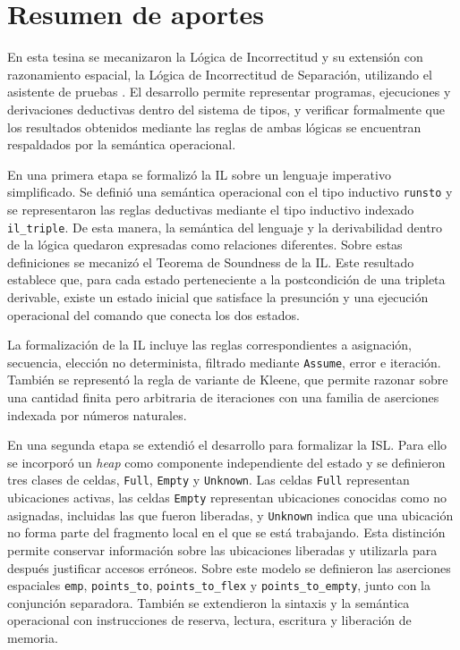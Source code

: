 \documentclass[a4paper,	11pt]{report}
\begin{document}
\section{Resumen de aportes}
\label{sec:aportes}
En esta tesina se mecanizaron la Lógica de Incorrectitud y su extensión con razonamiento espacial,
la Lógica de Incorrectitud de Separación, utilizando el asistente de pruebas \fstar{}.
El desarrollo permite representar programas,
ejecuciones y derivaciones deductivas dentro del sistema de tipos,
y verificar formalmente que los resultados obtenidos mediante las reglas de ambas lógicas se encuentran respaldados por la semántica operacional.

En una primera etapa se formalizó la IL sobre un lenguaje imperativo simplificado.
Se definió una semántica operacional con el tipo inductivo \lstinline|runsto| y se representaron las reglas deductivas
mediante el tipo inductivo indexado \lstinline|il_triple|.
De esta manera,
la semántica del lenguaje y la derivabilidad dentro de la lógica quedaron expresadas como relaciones diferentes.
Sobre estas definiciones se mecanizó el Teorema de Soundness de la IL.
Este resultado establece que,
para cada estado perteneciente a la postcondición de una tripleta derivable,
existe un estado inicial que satisface la presunción y una ejecución operacional del comando que conecta los dos estados.

La formalización de la IL incluye las reglas correspondientes a asignación,
secuencia, elección no determinista, filtrado mediante \lstinline|Assume|, error e iteración.
También se representó la regla de variante de Kleene,
que permite razonar sobre una cantidad finita pero arbitraria de iteraciones con una familia de aserciones indexada por números naturales.

En una segunda etapa se extendió el desarrollo para formalizar la ISL.
Para ello se incorporó un \emph{heap} como componente independiente del estado y se definieron tres clases de celdas,
\lstinline|Full|, \lstinline|Empty| y \lstinline|Unknown|.
Las celdas \lstinline|Full| representan ubicaciones activas,
las celdas \lstinline|Empty| representan ubicaciones conocidas como no asignadas,
incluidas las que fueron liberadas,
y \lstinline|Unknown| indica que una ubicación no forma parte del fragmento local en el que se está trabajando.
Esta distinción permite conservar información sobre las ubicaciones liberadas y utilizarla para después justificar accesos erróneos.
Sobre este modelo se definieron las aserciones espaciales \lstinline|emp|,
\lstinline|points_to|, \lstinline|points_to_flex| y \lstinline|points_to_empty|,
junto con la conjunción separadora.
También se extendieron la sintaxis y la semántica operacional con instrucciones de reserva,
lectura, escritura y liberación de memoria.
\end{document}
